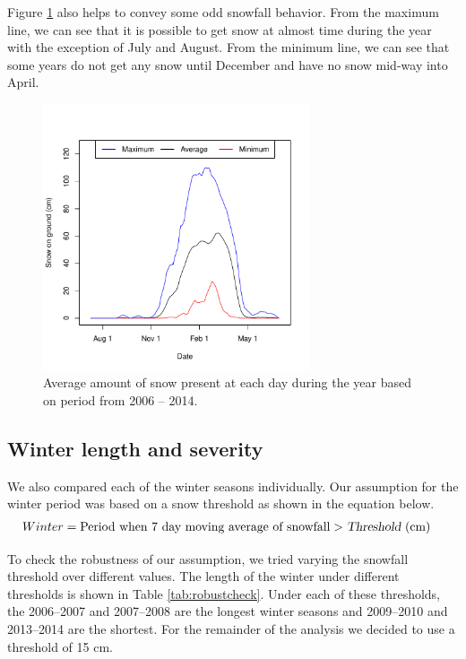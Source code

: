 \documentclass[12pt,twoside]{article}
\begin{document}
{Figure \ref{fig:averagetsplot} also helps to convey some odd snowfall behavior. From the maximum line, we can see that it is possible to get snow at almost time during the year with the exception of July and August. From the minimum line, we can see that some years do not get any snow until December and have no snow mid-way into April.


\begin{figure}[!ht]
\begin{center}
\includegraphics[width=0.7\textwidth]{report-averagetsplot}
\end{center}
\vspace{-8mm}
\caption{Average amount of snow present at each day during the year based on period from 2006 -- 2014.}
\label{fig:averagetsplot}
\end{figure}

\subsection{Winter length and severity}

We also compared each of the winter seasons individually. Our assumption for the winter period was based on a snow threshold as shown in the equation below.
%
\begin{align*}
Winter &= \text{Period when } \text{7 day moving average of} \text{ snowfall} > \textsl{Threshold} \text{ (cm)}
\end{align*}

\medskip To check the robustness of our assumption, we tried varying the snowfall threshold over different values. The length of the winter under different thresholds is shown in Table \ref{tab:robustcheck}. Under each of these thresholds, the 2006--2007 and 2007--2008 are the longest winter seasons and 2009--2010 and 2013--2014 are the shortest. For the remainder of the analysis we decided to use a threshold of 15 cm.

}
\end{document}
